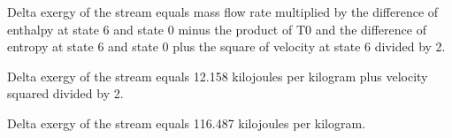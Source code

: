 Delta exergy of the stream equals mass flow rate multiplied by the difference of enthalpy at state 6 and state 0 minus the product of T0 and the difference of entropy at state 6 and state 0 plus the square of velocity at state 6 divided by 2.  

Delta exergy of the stream equals 12.158 kilojoules per kilogram plus velocity squared divided by 2.  

Delta exergy of the stream equals 116.487 kilojoules per kilogram.